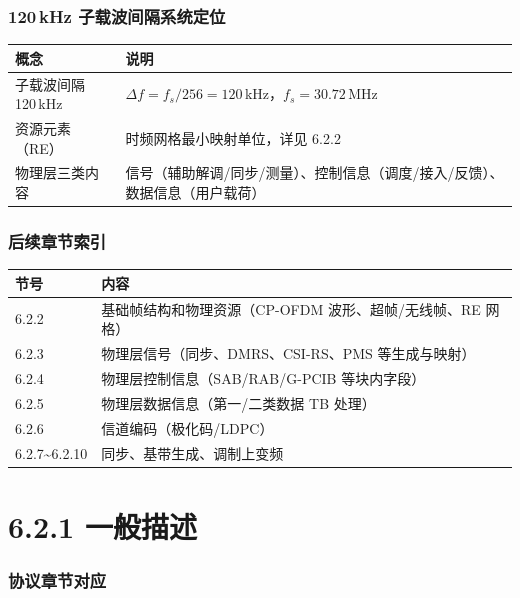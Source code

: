 \documentclass[11pt,a4paper]{ctexart}
\begin{document}
\section{120\,kHz 子载波间隔系统定位}

\begin{table}[h]
\centering
\begin{tabular}{ll}
\toprule
\textbf{概念} & \textbf{说明} \\
\midrule
子载波间隔 120\,kHz & $\Delta f = f_s/256 = 120$\,kHz，$f_s = 30.72$\,MHz \\
资源元素（RE） & 时频网格最小映射单位，详见 6.2.2 \\
物理层三类内容 & 信号（辅助解调/同步/测量）、控制信息（调度/接入/反馈）、数据信息（用户载荷） \\
\bottomrule
\end{tabular}
\end{table}

\section{后续章节索引}

\begin{table}[h]
\centering
\small
\begin{tabular}{ll}
\toprule
\textbf{节号} & \textbf{内容} \\
\midrule
6.2.2 & 基础帧结构和物理资源（CP-OFDM 波形、超帧/无线帧、RE 网格） \\
6.2.3 & 物理层信号（同步、DMRS、CSI-RS、PMS 等生成与映射） \\
6.2.4 & 物理层控制信息（SAB/RAB/G-PCIB 等块内字段） \\
6.2.5 & 物理层数据信息（第一/二类数据 TB 处理） \\
6.2.6 & 信道编码（极化码/LDPC） \\
6.2.7\textasciitilde 6.2.10 & 同步、基带生成、调制上变频 \\
\bottomrule
\end{tabular}
\end{table}

\newpage
\part{6.2.1 一般描述}

\section{协议章节对应}
\end{document}

